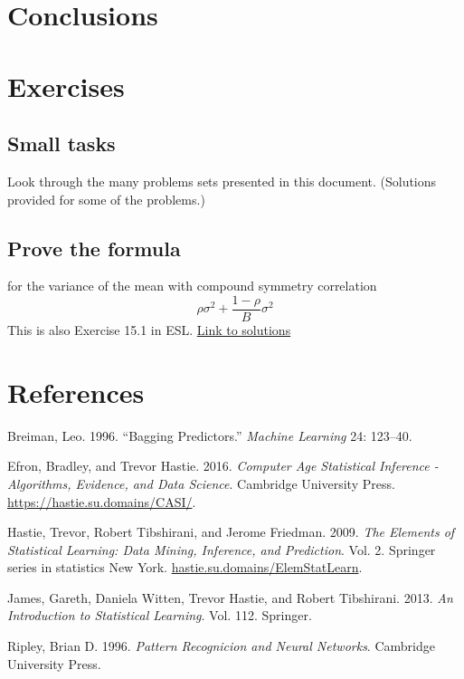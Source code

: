 \documentclass[
  letterpaper,
  DIV=11,
  numbers=noendperiod]{scrartcl}
\newlength{\cslhangindent}
\newlength{\cslentryspacingunit} %
\newenvironment{CSLReferences}[2] %
 {%
  \setlength{\parindent}{0pt}
  \ifodd #1
  \let\oldpar\par
  \def\par{\hangindent=\cslhangindent\oldpar}
  \fi
  \setlength{\parskip}{#2\cslentryspacingunit}
 }%
 {}
\begin{document}
\hypertarget{conclusions}{%
\section{Conclusions}\label{conclusions}}

\hypertarget{exercises}{%
\section{Exercises}\label{exercises}}

\hypertarget{small-tasks}{%
\subsection{Small tasks}\label{small-tasks}}

Look through the many problems sets presented in this document.
(Solutions provided for some of the problems.)

\hypertarget{prove-the-formula}{%
\subsection{Prove the formula}\label{prove-the-formula}}

for the variance of the mean with compound symmetry correlation
\[\rho \sigma^2+\frac{1-\rho}{B} \sigma^2\] This is also Exercise 15.1
in ESL. \href{./L5solex.pdf}{Link to solutions}

\hypertarget{references}{%
\section{References}\label{references}}

\hypertarget{refs}{}
\begin{CSLReferences}{1}{0}
\leavevmode{}%
Breiman, Leo. 1996. {``Bagging Predictors.''} \emph{Machine Learning}
24: 123--40.

\leavevmode{}%
Efron, Bradley, and Trevor Hastie. 2016. \emph{Computer Age Statistical
Inference - Algorithms, Evidence, and Data Science}. Cambridge
University Press. \url{https://hastie.su.domains/CASI/}.

\leavevmode{}%
Hastie, Trevor, Robert Tibshirani, and Jerome Friedman. 2009. \emph{The
Elements of Statistical Learning: Data Mining, Inference, and
Prediction}. Vol. 2. Springer series in statistics New York.
\href{https://hastie.su.domains/ElemStatLearn}{hastie.su.domains/ElemStatLearn}.

\leavevmode{}%
James, Gareth, Daniela Witten, Trevor Hastie, and Robert Tibshirani.
2013. \emph{An Introduction to Statistical Learning}. Vol. 112.
Springer.

\leavevmode{}%
Ripley, Brian D. 1996. \emph{Pattern Recognicion and Neural Networks}.
Cambridge University Press.

\end{CSLReferences}
\end{document}
